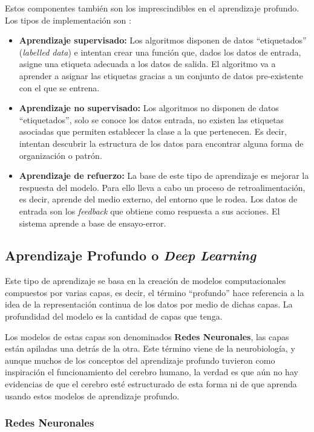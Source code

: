 Estos componentes también son los imprescindibles en el aprendizaje profundo. Los tipos de implementación son \cite{MD:machinelearning}:

\begin{itemize}
	\item \textbf{Aprendizaje supervisado:} Los algoritmos disponen de datos ``etiquetados'' (\textit{labelled data}) e intentan crear una función que, dados los datos de entrada, asigne una etiqueta adecuada a los datos de salida. El algoritmo va a aprender a asignar las etiquetas gracias a un conjunto de datos pre-existente con el que se entrena.
	\item \textbf{Aprendizaje no supervisado:} Los algoritmos no disponen de datos ``etiquetados'', solo se conoce los datos entrada, no existen las etiquetas asociadas que permiten establecer la clase a la que pertenecen. Es decir, intentan descubrir la estructura de los datos para encontrar alguna forma de organización o patrón.
	\item \textbf{Aprendizaje de refuerzo:} La base de este tipo de aprendizaje es mejorar la respuesta del modelo. Para ello lleva a cabo un proceso de retroalimentación, es decir, aprende del medio externo, del entorno que le rodea. Los datos de entrada son los \textit{feedback} que obtiene como respuesta a sus acciones. El sistema aprende a base de ensayo-error.
\end{itemize}

\subsection{Aprendizaje Profundo o \textit{Deep Learning}}

Este tipo de aprendizaje se basa en la creación de modelos computacionales compuestos por varias capas, es decir, el término ``profundo'' hace referencia a la idea de la representación continua de los datos por medio de dichas capas. La profundidad del modelo es la cantidad de capas que tenga.

Los modelos de estas capas son denominados \textbf{Redes Neuronales}, las capas están apiladas una detrás de la otra. Este término viene de la neurobiología, y aunque muchos de los conceptos del aprendizaje profundo tuvieron como inspiración el funcionamiento del cerebro humano, la verdad es que aún no hay evidencias de que el cerebro esté estructurado de esta forma ni de que aprenda usando estos modelos de aprendizaje profundo.

\subsubsection{Redes Neuronales}

